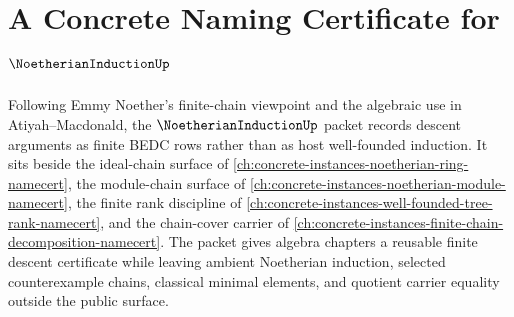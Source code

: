 \chapter{A Concrete Naming Certificate for $\NoetherianInductionUp$}
\label{ch:concrete-instances-noetherian-induction-namecert}

Following Emmy Noether's finite-chain viewpoint and the algebraic use in Atiyah--Macdonald, the $\NoetherianInductionUp$ packet records descent arguments as finite BEDC rows rather than as host well-founded induction. It sits beside the ideal-chain surface of \autoref{ch:concrete-instances-noetherian-ring-namecert}, the module-chain surface of \autoref{ch:concrete-instances-noetherian-module-namecert}, the finite rank discipline of \autoref{ch:concrete-instances-well-founded-tree-rank-namecert}, and the chain-cover carrier of \autoref{ch:concrete-instances-finite-chain-decomposition-namecert}. The packet gives algebra chapters a reusable finite descent certificate while leaving ambient Noetherian induction, selected counterexample chains, classical minimal elements, and quotient carrier equality outside the public surface.

